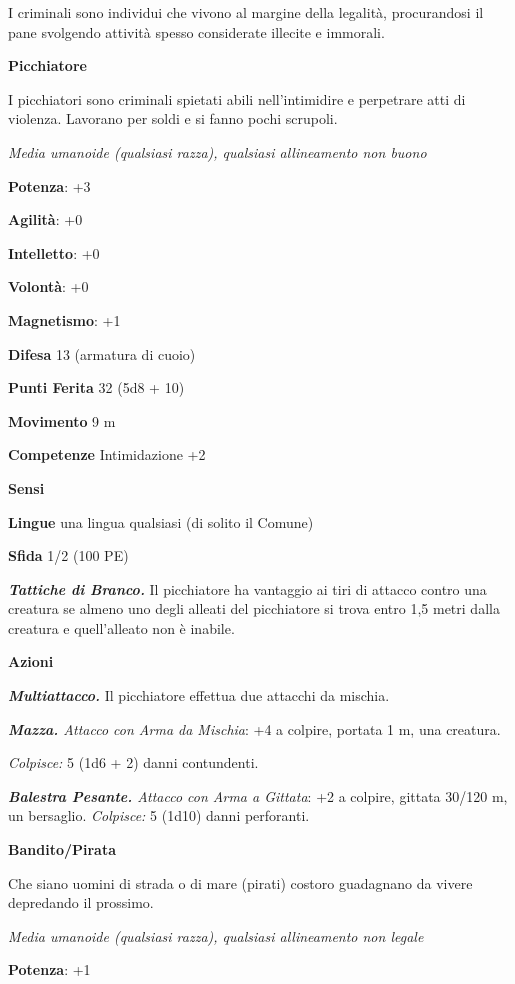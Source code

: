 \begin{multicols}{2}
I criminali sono individui che vivono al margine della legalità,
procurandosi il pane svolgendo attività spesso considerate illecite e
immorali.

\textbf{Picchiatore}

I picchiatori sono criminali spietati abili nell'intimidire e perpetrare
atti di violenza. Lavorano per soldi e si fanno pochi scrupoli.

\emph{Media umanoide (qualsiasi razza), qualsiasi allineamento non
buono}

\textbf{Potenza}: +3

\textbf{Agilità}: +0

\textbf{Intelletto}: +0

\textbf{Volontà}: +0

\textbf{Magnetismo}: +1

\textbf{Difesa} 13 (armatura di cuoio)

\textbf{Punti Ferita} 32 (5d8 + 10)

\textbf{Movimento} 9 m

\textbf{Competenze} Intimidazione +2

\textbf{Sensi} 

\textbf{Lingue} una lingua qualsiasi (di solito il Comune)

\textbf{Sfida} 1/2 (100 PE)\smallskip

\emph{\textbf{Tattiche di Branco.}} Il picchiatore ha vantaggio ai tiri
di attacco contro una creatura se almeno uno degli alleati del
picchiatore si trova entro 1,5 metri dalla creatura e quell'alleato non
è inabile.

\smallskip\textbf{Azioni}

\emph{\textbf{Multiattacco.}} Il picchiatore effettua due attacchi da
mischia.

\emph{\textbf{Mazza.} Attacco con Arma da Mischia}: +4 a colpire,
portata 1 m, una creatura.

\emph{Colpisce:} 5 (1d6 + 2) danni contundenti.

\emph{\textbf{Balestra Pesante.} Attacco con Arma a Gittata}: +2 a
colpire, gittata 30/120 m, un bersaglio. \emph{Colpisce:} 5 (1d10) danni
perforanti.

\textbf{Bandito/Pirata}

Che siano uomini di strada o di mare (pirati) costoro guadagnano da
vivere depredando il prossimo.

\emph{Media umanoide (qualsiasi razza), qualsiasi allineamento non
legale}

\textbf{Potenza}: +1


\end{multicols}
